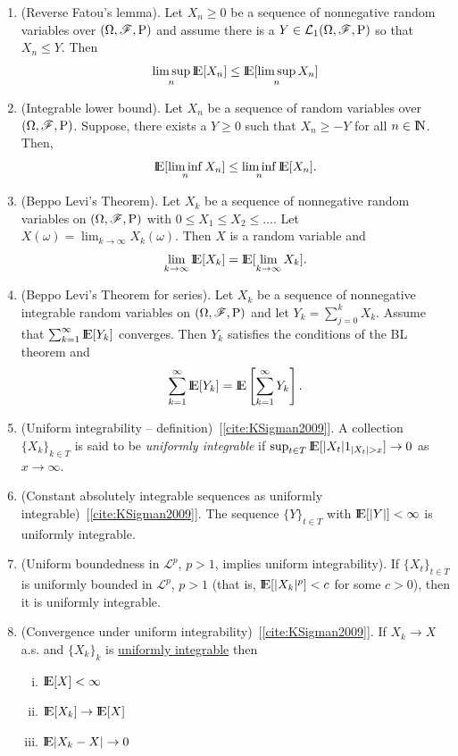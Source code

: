 \documentclass[a4paper,10pt]{scrbook}
\begin{document}
\begin{enumerate}
 \item 	(Reverse Fatou's lemma). Let $X_n\geq 0$ be a sequence of nonnegative random variables over $(\Omega,\mathscr{F},\mathrm{P})$ and
	assume there is a $Y\in\mathcal{L}_1(\Omega,\mathscr{F},\mathrm{P})$ so that $X_n\leq Y$. Then
	\[ 
	 \limsup_n \E[X_n] \leq \E[\limsup_n X_n]
	\]
 \item (Integrable lower bound). 	
	Let $X_n$ be a sequence of random variables over $(\Omega,\mathscr{F},\mathrm{P})$. Suppose, there exists a
	$Y\geq 0$ such that $X_n\geq -Y$ for all $n\in\N$. Then,
	\[
	\E[\liminf_n X_n] \leq  \liminf_n \E[X_n].
	\]
 \item (Beppo Levi's Theorem).
	Let $X_k$ be a sequence of nonnegative random variables on $(\Omega,\mathscr{F},\mathrm{P})$ with $0 \leq X_1 \leq X_{2} \leq \ldots$. 
	Let $X(\omega) = \lim_{k\to\infty}X_k(\omega)$. Then $X$ is a random variable and 
	\[
	 \lim_{k\to\infty} \E[X_k] = \E[\lim_{k\to\infty} X_k].
	\]
 \item (Beppo Levi's Theorem for series).
       Let $X_k$ be a sequence of nonnegative integrable random variables on $(\Omega,\mathscr{F},\mathrm{P})$
       and let $Y_k = \sum_{j=0}^k X_k$. Assume that $\sum_{k=1}^{\infty} \E[Y_k]$ converges.
       Then $Y_k$ satisfies the conditions of the BL theorem and
       \[
        \sum_{k=1}^{\infty} \E[Y_k] = \E \left[\sum_{k=1}^{\infty}Y_k\right].
       \]

 \item (\hypertarget{link:uniformly_integrable}{Uniform integrability} -- definition)~[\ref{cite:KSigman2009}]. A collection $\{X_k\}_{k\in T}$ is said to be \textit{uniformly
        integrable} if $\sup_{t\in T}\E[|X_t| 1_{|X_t|>x}] \to 0$ as $x\to\infty$.
        
 \item (Constant absolutely integrable sequences as uniformly integrable)~[\ref{cite:KSigman2009}]. The sequence $\{Y\}_{t\in T}$
       with $\E[|Y|]<\infty$ is uniformly integrable.

 \item (Uniform boundedness in $\mathcal{L}^p$, $p>1$, implies uniform integrability).
       If $\{X_t\}_{t\in T}$ is uniformly bounded in $\mathcal{L}^p$, $p>1$ (that is, 
       $\E[|X_k|^p] < c$ for some $c>0$), then it is uniformly integrable.
       
 \item (Convergence under uniform integrability)~[\ref{cite:KSigman2009}]. 
       If $X_k \to X$ a.s. and $\{X_k\}_k$ is \hyperlink{link:uniformly_integrable}{uniformly integrable} then
       \begin{enumerate}[i.]
         \item $\E[X]< \infty$
         \item $\E[X_k] \to \E[X]$        
        \item $\E|X_k-X|\to 0$
       \end{enumerate}

\end{enumerate}
\end{document}
